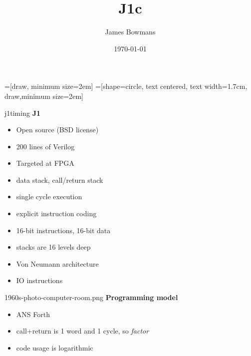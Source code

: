 \documentclass[compress,mathserif]{beamer}
\begin{document}
\title{J1c}   
\author{James Bowmans} 
\date{\today} 

\frame{\titlepage} 

=[draw, minimum size=2em]
=[shape=circle, text centered, text width=1.7cm, draw,minimum size=2em]
\everymath{\displaystyle}

\begin{imageframe}{j1timing}
  {\bf\Huge J1}
\end{imageframe}

\begin{frame}
\begin{itemize}
   \item Open source (BSD license)
   \item 200 lines of Verilog
   \item Targeted at FPGA
\end{itemize}
\end{frame}

\begin{frame}
\begin{itemize}
   \item data stack, call/return stack
   \item single cycle execution
   \item explicit instruction coding
\end{itemize}
\end{frame}

\begin{frame}
\begin{itemize}
   \item 16-bit instructions, 16-bit data
   \item stacks are 16 levels deep
   \item Von Neumann architecture
   \item IO instructions
\end{itemize}
\end{frame}

\begin{imageframe}{1960s-photo-computer-room.png}
  {\bf\Huge Programming model}
\end{imageframe}

\begin{frame}
\begin{itemize}
   \item ANS Forth
   \item call+return is 1 word and 1 cycle, so \textit{factor}
   \item code usage is logarithmic
\end{itemize}
\end{frame}
\end{document}
